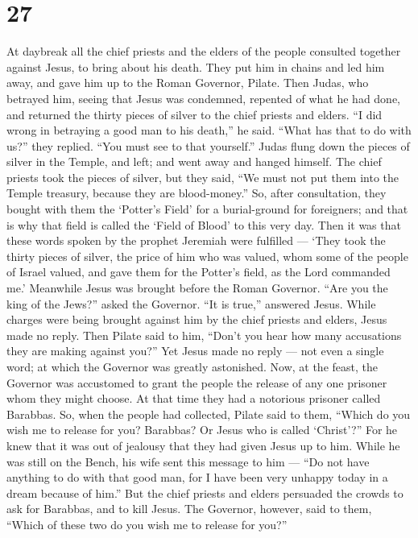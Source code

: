 \hypertarget{section-26}{%
\section{27}\label{section-26}}

 At daybreak all the chief priests and the elders of the
people consulted together against Jesus, to bring about his death.
 They put him in chains and led him away, and gave him up to
the Roman Governor, Pilate.  Then Judas, who betrayed him,
seeing that Jesus was condemned, repented of what he had done, and
returned the thirty pieces of silver to the chief priests and elders.
 ``I did wrong in betraying a good man to his death,'' he
said. ``What has that to do with us?'' they replied. ``You must see to
that yourself.''  Judas flung down the pieces of silver in
the Temple, and left; and went away and hanged himself.  The
chief priests took the pieces of silver, but they said, ``We must not
put them into the Temple treasury, because they are blood-money.''
 So, after consultation, they bought with them the `Potter's
Field' for a burial-ground for foreigners;  and that is why
that field is called the `Field of Blood' to this very day. 
Then it was that these words spoken by the prophet Jeremiah were
fulfilled --- `They took the thirty pieces of silver, the price of him
who was valued, whom some of the people of Israel valued, 
and gave them for the Potter's field, as the Lord commanded me.'
 Meanwhile Jesus was brought before the Roman Governor.
``Are you the king of the Jews?'' asked the Governor. ``It is true,''
answered Jesus.  While charges were being brought against
him by the chief priests and elders, Jesus made no reply. 
Then Pilate said to him, ``Don't you hear how many accusations they are
making against you?''  Yet Jesus made no reply --- not even
a single word; at which the Governor was greatly astonished.
 Now, at the feast, the Governor was accustomed to grant
the people the release of any one prisoner whom they might choose.
 At that time they had a notorious prisoner called
Barabbas.  So, when the people had collected, Pilate said
to them, ``Which do you wish me to release for you? Barabbas? Or Jesus
who is called `Christ'?''  For he knew that it was out of
jealousy that they had given Jesus up to him.  While he was
still on the Bench, his wife sent this message to him --- ``Do not have
anything to do with that good man, for I have been very unhappy today in
a dream because of him.''  But the chief priests and elders
persuaded the crowds to ask for Barabbas, and to kill Jesus.
 The Governor, however, said to them, ``Which of these two
do you wish me to release for you?''


